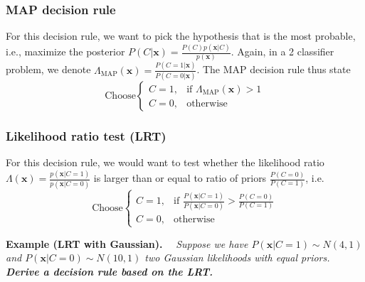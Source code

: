 \documentclass[a4paper,12pt]{article}
\newcommand{\xx}{{\bm x}}
\begin{document}
\subsubsection{MAP decision rule}
For this decision rule, we want to pick the hypothesis that is the most probable, i.e., maximize the posterior $P(C|\xx) = \frac{P(C)p(\xx|C)}{p(\xx)}$. Again, in a 2 classifier problem, we denote $\Lambda_{\text{MAP}}(\xx) = \frac{P(C=1|\xx)}{P(C=0|\xx)}$. The MAP decision rule thus state
\begin{equation*}
\text{Choose}
\begin{cases}
C=1, & \text{if } \Lambda_{\text{MAP}}(\xx) > 1 \\
C=0, & \text{otherwise}
\end{cases}
\end{equation*}
\subsubsection{Likelihood ratio test (LRT)}
For this decision rule, we would want to test whether the likelihood ratio $\Lambda(\xx) = \frac{p(\xx|C=1)}{p(\xx|C=0)}$ is larger than or equal to ratio of priors $\frac{P(C=0)}{P(C=1)}$, i.e.
\begin{equation*}
\text{Choose}
\begin{cases}
C = 1, & \text{if } \frac{P(\xx|C=1)}{P(\xx|C=0)} > \frac{P(C=0)}{P(C=1)}\\
C = 0, & \text{otherwise}
\end{cases}
\end{equation*}

\textbf{Example (LRT with Gaussian).$\quad$}
\textit{Suppose we have $P(\xx|C=1) \sim N(4,1)$ and $P(\xx|C=0) \sim N(10,1)$ two Gaussian likelihoods with equal priors. \textbf{Derive a decision rule based on the LRT.}} \\
\end{document}
